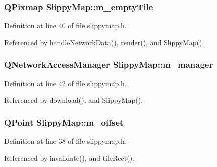 \hypertarget{classSlippyMap_a0021bf8f7ecbaa61bd47f8f0a36ea9d0}{
\subsubsection[{m\-\_\-empty\-Tile}]{\setlength{\rightskip}{0pt plus 5cm}Q\-Pixmap Slippy\-Map\-::m\-\_\-empty\-Tile\hspace{0.3cm}{\ttfamily [private]}}}\label{classSlippyMap_a0021bf8f7ecbaa61bd47f8f0a36ea9d0}


Definition at line 40 of file slippymap.\-h.



Referenced by handle\-Network\-Data(), render(), and Slippy\-Map().

\hypertarget{classSlippyMap_a7df40e5af7c39bca00ce51f69e68ce57}{
\subsubsection[{m\-\_\-manager}]{\setlength{\rightskip}{0pt plus 5cm}Q\-Network\-Access\-Manager Slippy\-Map\-::m\-\_\-manager\hspace{0.3cm}{\ttfamily [private]}}}\label{classSlippyMap_a7df40e5af7c39bca00ce51f69e68ce57}


Definition at line 42 of file slippymap.\-h.



Referenced by download(), and Slippy\-Map().

\hypertarget{classSlippyMap_a705bb1600f5003868b890f1e25a198a6}{
\subsubsection[{m\-\_\-offset}]{\setlength{\rightskip}{0pt plus 5cm}Q\-Point Slippy\-Map\-::m\-\_\-offset\hspace{0.3cm}{\ttfamily [private]}}}\label{classSlippyMap_a705bb1600f5003868b890f1e25a198a6}


Definition at line 38 of file slippymap.\-h.



Referenced by invalidate(), and tile\-Rect().

